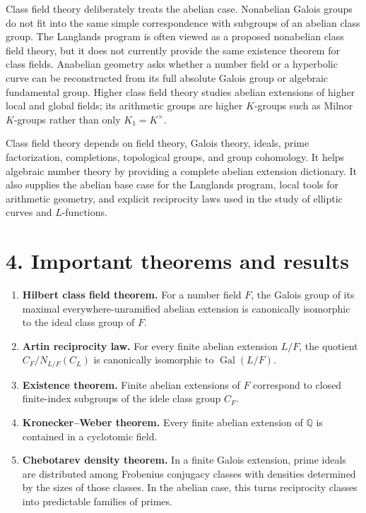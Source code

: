 Class field theory deliberately treats the abelian case. Nonabelian Galois groups do not fit into the same simple correspondence with subgroups of an abelian class group. The Langlands program is often viewed as a proposed nonabelian class field theory, but it does not currently provide the same existence theorem for class fields. Anabelian geometry asks whether a number field or a hyperbolic curve can be reconstructed from its full absolute Galois group or algebraic fundamental group. Higher class field theory studies abelian extensions of higher local and global fields; its arithmetic groups are higher $K$-groups such as Milnor $K$-groups rather than only $K_1=K^\times$. \cite{class_field_theory_ref1,class_field_theory_ref8}

Class field theory depends on field theory, Galois theory, ideals, prime factorization, completions, topological groups, and group cohomology. It helps algebraic number theory by providing a complete abelian extension dictionary. It also supplies the abelian base case for the Langlands program, local tools for arithmetic geometry, and explicit reciprocity laws used in the study of elliptic curves and $L$-functions.

\section*{4. Important theorems and results}
\begin{enumerate}[leftmargin=*,itemsep=0.35em]

\item \textbf{Hilbert class field theorem.} For a number field $F$, the Galois group of its maximal everywhere-unramified abelian extension is canonically isomorphic to the ideal class group of $F$. \cite{class_field_theory_ref1}

\item \textbf{Artin reciprocity law.} For every finite abelian extension $L/F$, the quotient $C_F/N_{L/F}(C_L)$ is canonically isomorphic to $\operatorname{Gal}(L/F)$. \cite{class_field_theory_ref1,class_field_theory_ref3}

\item \textbf{Existence theorem.} Finite abelian extensions of $F$ correspond to closed finite-index subgroups of the idele class group $C_F$. \cite{class_field_theory_ref1}

\item \textbf{Kronecker--Weber theorem.} Every finite abelian extension of $\mathbb Q$ is contained in a cyclotomic field. \cite{class_field_theory_ref4}

\item \textbf{Chebotarev density theorem.} In a finite Galois extension, prime ideals are distributed among Frobenius conjugacy classes with densities determined by the sizes of those classes. In the abelian case, this turns reciprocity classes into predictable families of primes. \cite{class_field_theory_ref2}
\end{enumerate}

